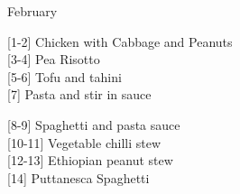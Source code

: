 		\begin{menu}{February}
    
    \begin{recipelist}
    
        {\scriptsize[1-2]} Chicken with Cabbage and Peanuts\\
        {\scriptsize[3-4]} Pea Risotto\\
        {\scriptsize[5-6]} Tofu and tahini\\
        {\scriptsize[7]} Pasta and stir in sauce\\%
    \end{recipelist}%
    \begin{recipelist}
    
        {\scriptsize[8-9]} Spaghetti and pasta sauce\\
        {\scriptsize[10-11]} Vegetable chilli stew\\
        {\scriptsize[12-13]} Ethiopian peanut stew\\
        {\scriptsize[14]} Puttanesca Spaghetti\\%
    \end{recipelist}\par%
  

\end{menu}
